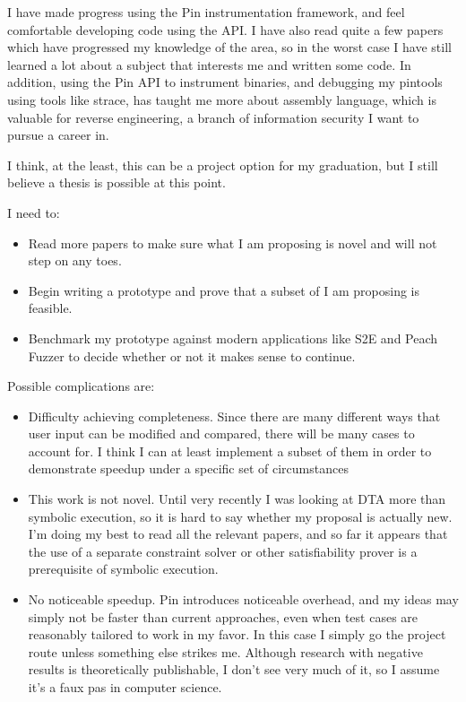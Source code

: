 \documentclass[10pt, twocolumn, times, nocopyrightspace, preprint]{sigplanconf}
\begin{document}
I have made progress using the Pin instrumentation framework, and feel comfortable developing code using the API. I have also read quite a few papers which have progressed my knowledge of the area, so in the worst case I have still learned a lot about a subject that interests me and written some code. In addition, using the Pin API to instrument binaries, and debugging my pintools using tools like strace, has taught me more about assembly language, which is valuable for reverse engineering, a branch of information security I want to pursue a career in.

I think, at the least, this can be a project option for my graduation, but I still believe a thesis is possible at this point.

I need to:
\begin{itemize}
	\item Read more papers to make sure what I am proposing is novel and will not step on any toes.
	\item Begin writing a prototype and prove that a subset of I am proposing is feasible.
	\item Benchmark my prototype against modern applications like S2E and Peach Fuzzer to decide whether or not it makes sense to continue.
\end{itemize}

Possible complications are:

\begin{itemize}
	\item Difficulty achieving completeness. Since there are many different ways that user input can be modified and compared, there will be many cases to account for. I think I can at least implement a subset of them in order to demonstrate speedup under a specific set of circumstances
	\item This work is not novel. Until very recently I was looking at DTA more than symbolic execution, so it is hard to say whether my proposal is actually new. I'm doing my best to read all the relevant papers, and so far it appears that the use of a separate constraint solver or other satisfiability prover is a prerequisite of symbolic execution.
	\item No noticeable speedup. Pin introduces noticeable overhead, and my ideas may simply not be faster than current approaches, even when test cases are reasonably tailored to work in my favor. In this case I simply go the project route unless something else strikes me. Although research with negative results is theoretically publishable, I don't see very much of it, so I assume it's a faux pas in computer science.
\end{itemize}
	
\end{document}
